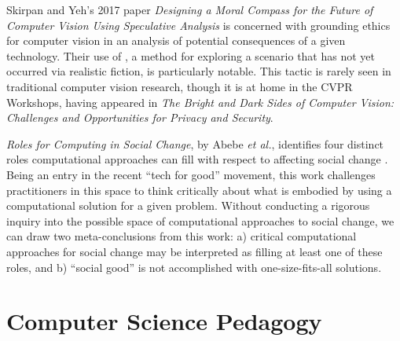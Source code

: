 \documentclass{article}
\newcommand{\etal}{\textit{et al.}}
\begin{document}
    Skirpan and Yeh's 2017 paper \textit{Designing a Moral Compass for the Future of Computer Vision Using Speculative Analysis }\cite{skirpanDesigningMoralCompass2017} is concerned with grounding ethics for computer vision in an analysis of potential consequences of a given technology. Their use of , a method for exploring a scenario that has not yet occurred via realistic fiction, is particularly notable.
    This tactic is rarely seen in traditional computer vision research, though it is at home in the CVPR Workshops, having appeared in \textit{The Bright and Dark Sides of Computer Vision: Challenges and Opportunities for Privacy and Security}.
    
    \textit{Roles for Computing in Social Change}, by Abebe \etal, identifies four distinct roles computational approaches can fill with respect to affecting social change \cite{abebeRolesComputingSocial2019}. Being an entry in the recent ``tech for good'' movement, this work challenges practitioners in this space to think critically about what is embodied by using a computational solution for a given problem. Without conducting a rigorous inquiry into the possible space of computational approaches to social change, we can draw two meta-conclusions from this work: a) critical computational approaches for social change may be interpreted as filling at least one of these roles, and b) ``social good'' is not accomplished with one-size-fits-all solutions.
    
\section{Computer Science Pedagogy}
    
\end{document}
